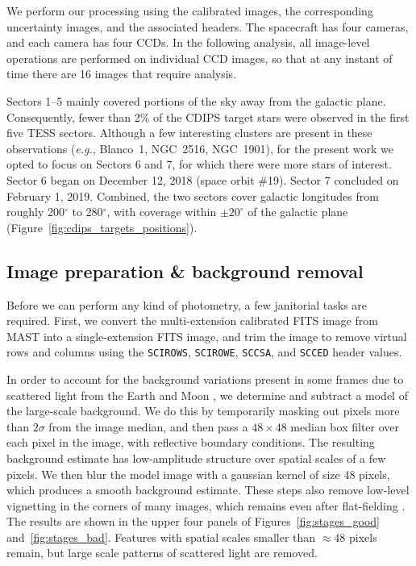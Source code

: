 \documentclass[12pt,twocolumn,tighten]{aastex62}
\begin{document}
We perform our processing using the calibrated images, the
corresponding uncertainty images, and the associated headers.  The
spacecraft has four cameras, and each camera has four CCDs.  In the
following analysis, all image-level operations are performed on
individual CCD images, so that at any instant of time there are 16
images that require analysis.

Sectors 1--5 mainly covered portions of the sky away from the galactic
plane.  Consequently, fewer than 2\% of the CDIPS target stars were
observed in the first five TESS sectors.  Although a few interesting
clusters are present in these observations ({\it e.g.}, Blanco~1,
NGC~2516, NGC~1901), for the present work we opted to focus on Sectors
6 and 7, for which there were more stars of interest.  Sector 6
began on December 12, 2018 (space orbit \#19). Sector 7 concluded
on February 1, 2019. Combined, the two sectors
cover galactic longitudes from roughly 200$^\circ$ to 280$^\circ$,
with coverage within $\pm 20^\circ$ of the galactic plane
(Figure~\ref{fig:cdips_targets_positions}).


\subsection{Image preparation \& background removal}
\label{subsec:preparation}

Before we can perform any kind of photometry, a few janitorial tasks
are required.  First, we convert the multi-extension calibrated FITS
image from MAST into a single-extension FITS image, and trim the image
to remove virtual rows and columns using the \texttt{SCIROWS},
\texttt{SCIROWE}, \texttt{SCCSA}, and \texttt{SCCED} header values.

In order to account for the background variations present in some
frames due to scattered light from the Earth and Moon \citep[see][\S
7.3.1--7.3.4]{vanderspek_2018}, we determine and subtract a model of
the large-scale background.  We do this by temporarily masking out
pixels more than $2\sigma$ from the image median, and then pass a
$48\times48$ median box filter over each pixel in the image, with
reflective boundary conditions.  The resulting background estimate has
low-amplitude structure over spatial scales of a few pixels. We then
blur the model image with a gaussian kernel of size 48 pixels, which
produces a smooth background estimate.  These steps also remove
low-level vignetting in the corners of many images, which remains even
after flat-fielding \citep[see][\S 7.3.5]{vanderspek_2018}.  The
results are shown in the upper four panels of
Figures~\ref{fig:stages_good} and~\ref{fig:stages_bad}.  Features with
spatial scales smaller than $\approx$48 pixels remain, but large scale
patterns of scattered light are removed.
\end{document}
